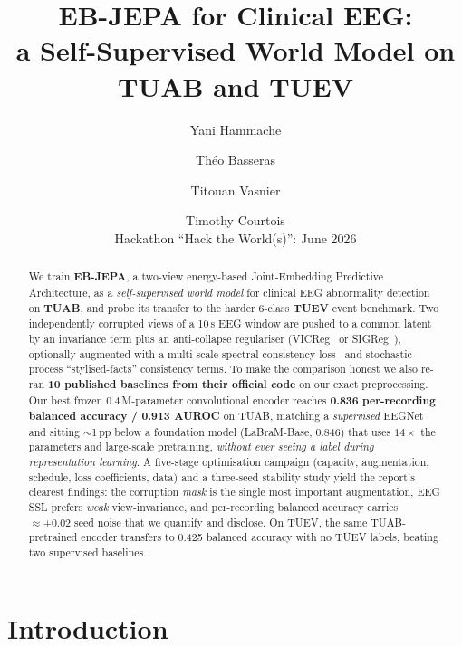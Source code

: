 \documentclass[10pt,a4paper]{article}
\title{\vspace{-1.2cm}\textbf{EB-JEPA for Clinical EEG:\\ a Self-Supervised World Model on TUAB and TUEV}}
\author{Yani Hammache \and Théo Basseras \and Titouan Vasnier \and Timothy Courtois \\
  \small Hackathon ``Hack the World(s)'': June 2026}
\date{}
\begin{document}
\maketitle
\vspace{-0.8cm}

\begin{abstract}
\noindent We train \textbf{EB-JEPA}, a two-view energy-based Joint-Embedding Predictive Architecture, as a
\emph{self-supervised world model} for clinical EEG abnormality detection on \textbf{TUAB}, and probe its
transfer to the harder 6-class \textbf{TUEV} event benchmark. Two independently corrupted views of a 10\,s
EEG window are pushed to a common latent by an invariance term plus an anti-collapse regulariser
(VICReg~\cite{vicreg} or SIGReg~\cite{lejepa}), optionally augmented with a multi-scale spectral
consistency loss~\cite{engel2020ddsp} and stochastic-process ``stylised-facts'' consistency terms. To make
the comparison honest we also re-ran \textbf{10 published baselines from their official code} on our exact
preprocessing. Our best frozen 0.4\,M-parameter convolutional encoder reaches \textbf{0.836 per-recording
balanced accuracy / 0.913 AUROC} on TUAB, matching a \emph{supervised} EEGNet and sitting $\sim$1\,pp
below a foundation model (LaBraM-Base, 0.846) that uses $14\times$ the parameters and large-scale
pretraining, \emph{without ever seeing a label during representation learning}. A five-stage optimisation
campaign (capacity, augmentation, schedule, loss coefficients, data) and a three-seed stability study yield
the report's clearest findings: the corruption \emph{mask} is the single most important augmentation, EEG
SSL prefers \emph{weak} view-invariance, and per-recording balanced accuracy carries $\approx\pm0.02$ seed
noise that we quantify and disclose. On TUEV, the same TUAB-pretrained encoder transfers to 0.425 balanced
accuracy with no TUEV labels, beating two supervised baselines.
\end{abstract}

\tableofcontents
\vspace{0.3cm}

\section{Introduction}
\label{sec:intro}
\end{document}
